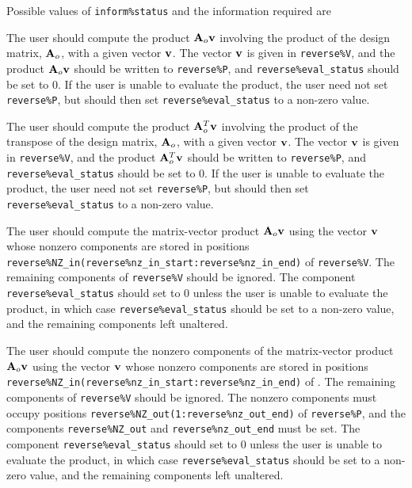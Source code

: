 \documentclass{galahad}
\begin{document}
Possible values of {\tt inform\%status} and the information required are
\begin{description}

 The user should compute the product ${\mathbf{A}}_o {\mathbf{v}}$
     involving the product of the design matrix, ${\mathbf{A}}_o$,
     with a given vector ${\mathbf{v}}$.
     The vector ${\mathbf{v}}$ is given in {\tt reverse\%V}, and the
     product ${\mathbf{A}}_o {\mathbf{v}}$ should be written to {\tt reverse\%P},
     and  {\tt reverse\%eval\_status} should be set to 0.
     If the user is unable to evaluate the product,
     the user need not set {\tt reverse\%P}, but
     should then set {\tt reverse\%eval\_status} to a non-zero value.

 The user should compute the product ${\mathbf{A}}_o^T {\mathbf{v}}$
     involving the product of the transpose of the design matrix,
     ${\mathbf{A}}_o$,  with a given vector ${\mathbf{v}}$.
     The vector ${\mathbf{v}}$ is given in {\tt reverse\%V}, and the
     product ${\mathbf{A}}_o^T {\mathbf{v}}$ should be written to {\tt reverse\%P},
     and  {\tt reverse\%eval\_status} should be set to 0.
     If the user is unable to evaluate the product,
     the user need not set {\tt reverse\%P}, but
     should then set {\tt reverse\%eval\_status} to a non-zero value.

 The user should compute the matrix-vector product ${\mathbf{A}}_o {\mathbf{v}}$
     using the vector ${\mathbf{v}}$ whose nonzero components are stored in positions
     {\tt reverse\%NZ\_in(reverse\%nz\_in\_start:reverse\%nz\_in\_end)}
     of {\tt reverse\%V}. The remaining components of
     {\tt reverse\%V} should be ignored.
     The component {\tt reverse\%eval\_status} should set to 0 unless the
     user is unable to evaluate the product, in which case
     {\tt reverse\%eval\_status} should be set to a non-zero value, and the
     remaining components left unaltered.

 The user should compute the nonzero components of the
     matrix-vector product ${\mathbf{A}}_o {\mathbf{v}}$ using the vector ${\mathbf{v}}$ whose
     nonzero components are stored in positions
     {\tt reverse\%NZ\_in(reverse\%nz\_in\_start:reverse\%nz\_in\_end)}
     of . The remaining components of
     {\tt reverse\%V} should be ignored. The nonzero components must
     occupy positions
     {\tt reverse\%NZ\_out(1:reverse\%nz\_out\_end)} of {\tt reverse\%P},
     and the components
     {\tt reverse\%NZ\_out} and {\tt reverse\%nz\_out\_end} must be set.
     The component {\tt reverse\%eval\_status} should set to 0 unless the
     user is unable to evaluate the product, in which case
     {\tt reverse\%eval\_status} should be set to a non-zero value, and the
      remaining components left unaltered.


\end{description}
\end{document}
